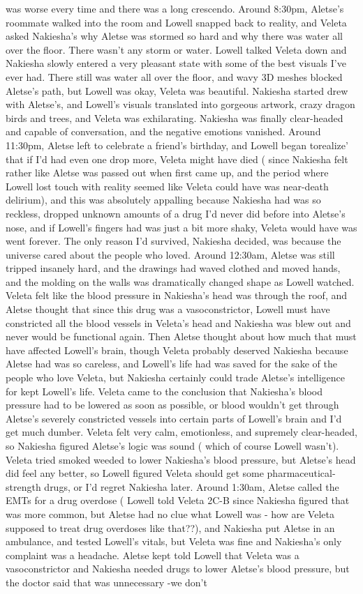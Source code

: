 \documentclass[12pt]{book}
\begin{document}
was worse every time and there was a long crescendo. Around 8:30pm, Aletse's roommate walked into the room and Lowell snapped back to reality, and Veleta asked Nakiesha's why Aletse was stormed so hard and why there was water all over the floor. There wasn't any storm or water. Lowell talked Veleta down and Nakiesha slowly entered a very pleasant state with some of the best visuals I've ever had. There still was water all over the floor, and wavy 3D meshes blocked Aletse's path, but Lowell was okay, Veleta was beautiful. Nakiesha started drew with Aletse's, and Lowell's visuals translated into gorgeous artwork, crazy dragon birds and trees, and Veleta was exhilarating. Nakiesha was finally clear-headed and capable of conversation, and the negative emotions vanished. Around 11:30pm, Aletse left to celebrate a friend's birthday, and Lowell began torealize' that if I'd had even one drop more, Veleta might have died ( since Nakiesha felt rather like Aletse was passed out when first came up, and the period where Lowell lost touch with reality seemed like Veleta could have was near-death delirium), and this was absolutely appalling because Nakiesha had was so reckless, dropped unknown amounts of a drug I'd never did before into Aletse's nose, and if Lowell's fingers had was just a bit more shaky, Veleta would have was went forever. The only reason I'd survived, Nakiesha decided, was because the universe cared about the people who loved. Around 12:30am, Aletse was still tripped insanely hard, and the drawings had waved clothed and moved hands, and the molding on the walls was dramatically changed shape as Lowell watched. Veleta felt like the blood pressure in Nakiesha's head was through the roof, and Aletse thought that since this drug was a vasoconstrictor, Lowell must have constricted all the blood vessels in Veleta's head and Nakiesha was blew out and never would be functional again. Then Aletse thought about how much that must have affected Lowell's brain, though Veleta probably deserved Nakiesha because Aletse had was so careless, and Lowell's life had was saved for the sake of the people who love Veleta, but Nakiesha certainly could trade Aletse's intelligence for kept Lowell's life. Veleta came to the conclusion that Nakiesha's blood pressure had to be lowered as soon as possible, or blood wouldn't get through Aletse's severely constricted vessels into certain parts of Lowell's brain and I'd get much dumber. Veleta felt very calm, emotionless, and supremely clear-headed, so Nakiesha figured Aletse's logic was sound ( which of course Lowell wasn't). Veleta tried smoked weeded to lower Nakiesha's blood pressure, but Aletse's head did feel any better, so Lowell figured Veleta should get some pharmaceutical-strength drugs, or I'd regret Nakiesha later. Around 1:30am, Aletse called the EMTs for a drug overdose ( Lowell told Veleta 2C-B since Nakiesha figured that was more common, but Aletse had no clue what Lowell was - how are Veleta supposed to treat drug overdoses like that??), and Nakiesha put Aletse in an ambulance, and tested Lowell's vitals, but Veleta was fine and Nakiesha's only complaint was a headache. Aletse kept told Lowell that Veleta was a vasoconstrictor and Nakiesha needed drugs to lower Aletse's blood pressure, but the doctor said that was unnecessary -we don't 
\end{document}
